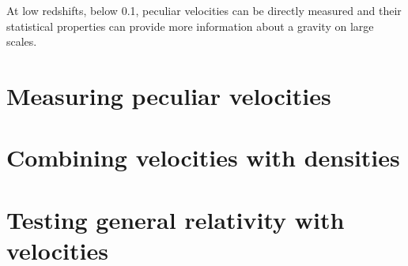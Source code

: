 \chaptertoc{}

\vspace{1em}


At low redshifts, below 0.1, peculiar velocities can be directly measured
and their statistical properties can provide more information about a
gravity on large scales. 

\section{Measuring peculiar velocities}

\section{Combining velocities with densities}

\section{Testing general relativity with velocities}



